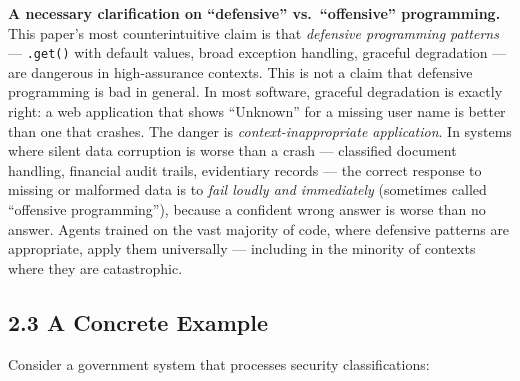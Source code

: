 \documentclass[a4paper,11pt]{report}
\begin{document}
\textbf{A necessary clarification on ``defensive'' vs.~``offensive''
programming.} This paper's most counterintuitive claim is that
\emph{defensive programming patterns} --- \texttt{.get()} with default
values, broad exception handling, graceful degradation --- are dangerous
in high-assurance contexts. This is not a claim that defensive
programming is bad in general. In most software, graceful degradation is
exactly right: a web application that shows ``Unknown'' for a missing
user name is better than one that crashes. The danger is
\emph{context-inappropriate application}. In systems where silent data
corruption is worse than a crash --- classified document handling,
financial audit trails, evidentiary records --- the correct response to
missing or malformed data is to \emph{fail loudly and immediately}
(sometimes called ``offensive programming''), because a confident wrong
answer is worse than no answer. Agents trained on the vast majority of
code, where defensive patterns are appropriate, apply them universally
--- including in the minority of contexts where they are catastrophic.

\hypertarget{a-concrete-example}{%
\subsection{2.3 A Concrete Example}\label{a-concrete-example}}

Consider a government system that processes security classifications:
\end{document}
